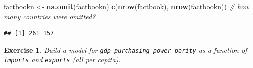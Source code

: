 \documentclass[10pt,b5paper,krantz1]{krantz}
\newenvironment{Shaded}{\begin{snugshade}}{\end{snugshade}}
\newcommand{\CommentTok}[1]{\textcolor[rgb]{0.37,0.37,0.37}{\textit{#1}}}
\newcommand{\KeywordTok}[1]{\textcolor[rgb]{0.27,0.27,0.27}{\textbf{#1}}}
\newcommand{\NormalTok}[1]{#1}
\newcommand{\StringTok}[1]{\textcolor[rgb]{0.5,0.5,0.5}{#1}}
\newtheorem{exercise}{Exercise}[chapter]
\begin{document}
\begin{Shaded}
\begin{Highlighting}[]
\NormalTok{factbookn <-}\StringTok{ }\KeywordTok{na.omit}\NormalTok{(factbookn)}
\KeywordTok{c}\NormalTok{(}\KeywordTok{nrow}\NormalTok{(factbook), }\KeywordTok{nrow}\NormalTok{(factbookn)) }\CommentTok{# how many countries were omitted?}
\end{Highlighting}
\end{Shaded}

\begin{verbatim}
## [1] 261 157
\end{verbatim}

\begin{exercise}

Build a model for \texttt{gdp\_purchasing\_power\_parity} as a function
of \texttt{imports} and \texttt{exports} (all per capita).

\end{exercise}
\end{document}
